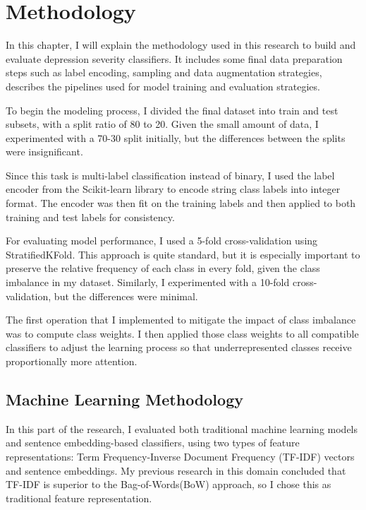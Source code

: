 \section{Methodology}

In this chapter, I will explain the methodology used in this research to build and evaluate depression severity classifiers. It includes some final data preparation steps such as label encoding, sampling and data augmentation strategies, describes the pipelines used for model training and evaluation strategies.

To begin the modeling process, I divided the final dataset into train and test subsets, with a split ratio of 80 to 20. Given the small amount of data, I experimented with a 70-30 split initially, but the differences between the splits were insignificant.

Since this task is multi-label classification instead of binary, I used the label encoder from the Scikit-learn library to encode string class labels into integer format. The encoder was then fit on the training labels and then applied to both training and test labels for consistency.

For evaluating model performance, I used a 5-fold cross-validation using StratifiedKFold. This approach is quite standard, but it is especially important to preserve the relative frequency of each class in every fold, given the class imbalance in my dataset. Similarly, I experimented with a 10-fold cross-validation, but the differences were minimal.

The first operation that I implemented to mitigate the impact of class imbalance was to compute class weights. I then applied those class weights to all compatible classifiers to adjust the learning process so that underrepresented classes receive proportionally more attention.

\subsection{Machine Learning Methodology}

In this part of the research, I evaluated both traditional machine learning models and sentence embedding-based classifiers, using two types of feature representations: Term Frequency-Inverse Document Frequency (TF-IDF) vectors and sentence embeddings. My previous research in this domain concluded that TF-IDF is superior to the Bag-of-Words(BoW) approach, so I chose this as traditional feature representation.

